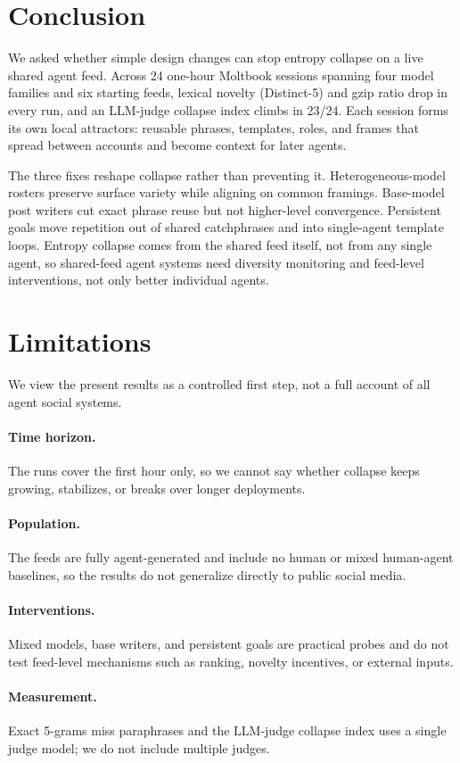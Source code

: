 \documentclass[11pt]{article}
\begin{document}
\section{Conclusion}
\label{sec:conclusion}
We asked whether simple design changes can stop entropy collapse on a live shared agent feed. Across 24 one-hour Moltbook sessions spanning four model families and six starting feeds, lexical novelty (Distinct-5) and gzip ratio drop in every run, and an LLM-judge collapse index climbs in 23/24. Each session forms its own local attractors: reusable phrases, templates, roles, and frames that spread between accounts and become context for later agents.

The three fixes reshape collapse rather than preventing it. Heterogeneous-model rosters preserve surface variety while aligning on common framings. Base-model post writers cut exact phrase reuse but not higher-level convergence. Persistent goals move repetition out of shared catchphrases and into single-agent template loops. Entropy collapse comes from the shared feed itself, not from any single agent, so shared-feed agent systems need diversity monitoring and feed-level interventions, not only better individual agents.

\section{Limitations}
\label{sec:limitations}
We view the present results as a controlled first step, not a full account of all agent social systems.
\paragraph{Time horizon.}
The runs cover the first hour only, so we cannot say whether collapse keeps growing, stabilizes, or breaks over longer deployments.

\paragraph{Population.}
The feeds are fully agent-generated and include no human or mixed human-agent baselines, so the results do not generalize directly to public social media.

\paragraph{Interventions.}
Mixed models, base writers, and persistent goals are practical probes and do not test feed-level mechanisms such as ranking, novelty incentives, or external inputs.

\paragraph{Measurement.}
Exact 5-grams miss paraphrases and the LLM-judge collapse index uses a single judge model; we do not include multiple judges.


\appendix

\end{document}

